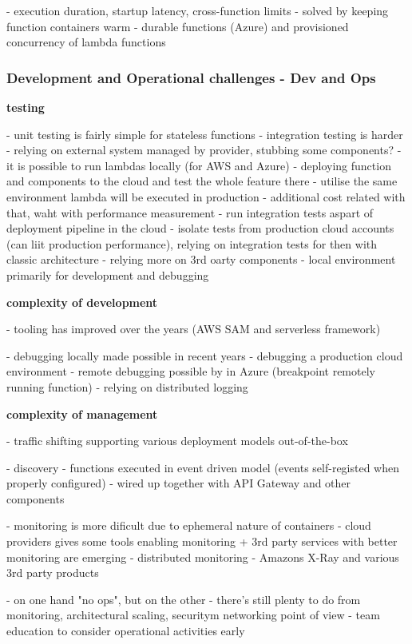- execution duration, startup latency, cross-function limits - solved by keeping function containers warm - durable functions (Azure) and provisioned concurrency of lambda functions

\subsubsection*{Development and Operational challenges - Dev and Ops} 

\textbf{testing} 

- unit testing is fairly simple for stateless functions
- integration testing is harder - relying on external system managed by provider, stubbing some components?
- it is possible to run lambdas locally (for AWS and Azure)
- deploying function and components to the cloud and test the whole feature there - utilise the same environment lambda will be executed in production - additional cost related with that, waht with performance measurement
- run integration tests aspart of deployment pipeline in the cloud - isolate tests from production cloud accounts (can liit production performance), relying on integration tests for then with classic architecture - relying more on 3rd oarty components
- local environment primarily for development and debugging

\textbf{complexity of development} 

- tooling has improved over the years (AWS SAM and serverless framework)

- debugging locally made possible in recent years
- debugging a production cloud environment - remote debugging possible by in Azure (breakpoint remotely running function) - relying on distributed logging

\textbf{complexity of management} 

- traffic shifting supporting various deployment models out-of-the-box

- discovery - functions executed in event driven model (events self-registed when properly configured) - wired up together with API Gateway and other components

- monitoring is more dificult due to ephemeral nature of containers - cloud providers gives some tools enabling monitoring + 3rd party services with better monitoring are emerging
- distributed monitoring - Amazons X-Ray and various 3rd party products

- on one hand "no ops", but on the other - there's still plenty to do from monitoring, architectural scaling, securitym networking point of view - team education to consider operational activities early

